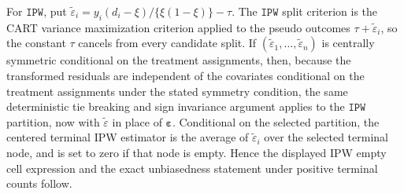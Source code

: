 \documentclass[10pt]{article}
\def\bvarepsilon{\boldsymbol{\varepsilon}}
\def\IPW{\mathtt{IPW}}
\theoremstyle{definition}
\theoremstyle{remark}
\begin{document}
For $\IPW$, put $\tilde\varepsilon_i=y_i(d_i-\xi)/\{\xi(1-\xi)\}-\tau$. The $\IPW$ split criterion is the CART variance maximization criterion applied to the pseudo outcomes $\tau+\tilde\varepsilon_i$, so the constant $\tau$ cancels from every candidate split. If $(\tilde\varepsilon_1,\ldots,\tilde\varepsilon_n)$ is centrally symmetric conditional on the treatment assignments, then, because the transformed residuals are independent of the covariates conditional on the treatment assignments under the stated symmetry condition, the same deterministic tie breaking and sign invariance argument applies to the $\IPW$ partition, now with $\tilde\varepsilon$ in place of $\bvarepsilon$. Conditional on the selected partition, the centered terminal IPW estimator is the average of $\tilde\varepsilon_i$ over the selected terminal node, and is set to zero if that node is empty. Hence the displayed IPW empty cell expression and the exact unbiasedness statement under positive terminal counts follow.




\end{document}

